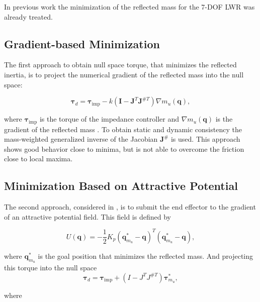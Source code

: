In previous work \cite{paper_iros2017} the minimization of the reflected mass for the 7-DOF LWR was already treated.  
\subsection{Gradient-based  Minimization}
\label{subsec:gbm_7DOF}

The first approach to obtain null space torque, that minimizes the reflected inertia, is to project the numerical gradient of the reflected mass into the null space:
 
\begin{equation}
\mathbf{\tau}_d = \mathbf{\tau}_\mathrm{imp} - k (\mathbf{I} - \mathbf{J}^T \mathbf{J}^{\#T}) \nabla m_u(\mathbf{q}), \label{eq:gbm_nico}
\end{equation}

where $\mathbf{\tau}_\mathrm{imp}$ is the torque of the impedance controller and $\nabla m_u(\mathbf{q})$ is the gradient of the reflected mass \cite{paper_iros2017}. To obtain static and dynamic consistency \cite{khatib1995} the mass-weighted generalized inverse of the Jacobian $\mathbf{J}^{\#}$ is used.
This approach shows good behavior close to minima, but is not able to overcome the friction close to local maxima. 




\subsection{Minimization Based on Attractive Potential}
\label{subsec:minim_potential_intro}


The second approach, considered in \cite{paper_iros2017}, is to submit the end effector to the gradient of an attractive potential field. This field is defined by 


\begin{equation}
U(\mathbf{q}) = - \frac{1}{2} K_p (\mathbf{q}_{m_u}^\ast - \mathbf{q})^T (\mathbf{q}_{m_u}^\ast - \mathbf{q}), \label{eq:potential_intro}
\end{equation}

where $\mathbf{q}_{m_u}^\ast$ is the goal position that minimizes the reflected mass. And projecting this torque into the null space
\begin{equation}
\mathbf{\tau}_d = \mathbf{\tau}_\mathrm{imp} + (I - J^T J^{\#T}) \mathbf{\tau}_{m_u}^\ast, \label{eq:potential_controller_intro}
\end{equation}

where 

